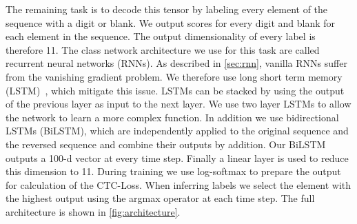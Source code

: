 The remaining task is to decode this tensor by labeling every element of the sequence with a digit or blank.
We output scores for every digit and blank for each element in the sequence.
The output dimensionality of every label is therefore 11.
The class network architecture we use for this task are called recurrent neural networks (RNNs).
As described in \autoref{sec:rnn}, vanilla RNNs suffer from the vanishing gradient problem.
We therefore use long short term memory (LSTM)~\cite{LSTM}, which mitigate this issue.
LSTMs can be stacked by using the output of the previous layer as input to the next layer.
We use two layer LSTMs to allow the network to learn a more complex function.
In addition we use bidirectional LSTMs (BiLSTM), which are independently applied to the original sequence and the reversed sequence and combine their outputs by addition.
Our BiLSTM outputs a 100-d vector at every time step.
Finally a linear layer is used to reduce this dimension to 11.
During training we use log-softmax to prepare the output for calculation of the CTC-Loss.
When inferring labels we select the element with the highest output using the argmax operator at each time step.
The full architecture is shown in \autoref{fig:architecture}.

